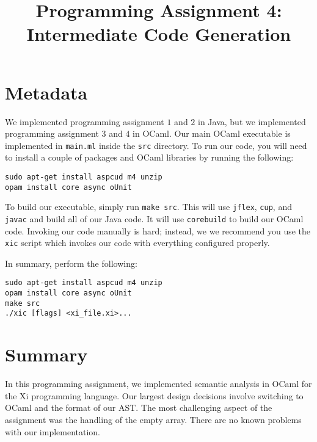 \documentclass{hw}
\title{Programming Assignment 4:\\ Intermediate Code Generation}
\begin{document}
\maketitle

\section{Metadata}\label{sec:metadata}
We implemented programming assignment $1$ and $2$ in Java, but we implemented
programming assignment $3$ and $4$ in OCaml. Our main OCaml executable is
implemented in \texttt{main.ml} inside the \texttt{src} directory. To run our
code, you will need to install a couple of packages and OCaml libraries by
running the following:

\begin{center}
\begin{BVerbatim}
sudo apt-get install aspcud m4 unzip
opam install core async oUnit
\end{BVerbatim}
\end{center}

To build our executable, simply run \texttt{make src}. This will use
\texttt{jflex}, \texttt{cup}, and \texttt{javac} and build all of our Java
code. It will use \texttt{corebuild} to build our OCaml code. Invoking our
code manually is hard; instead, we we recommend you use the \texttt{xic} script
which invokes our code with everything configured properly.

In summary, perform the following:

\begin{center}
\begin{BVerbatim}
sudo apt-get install aspcud m4 unzip
opam install core async oUnit
make src
./xic [flags] <xi_file.xi>...
\end{BVerbatim}
\end{center}

\section{Summary}\label{sec:summary}
In this programming assignment, we implemented semantic analysis in OCaml for
the Xi programming language. Our largest design decisions involve switching to
OCaml and the format of our AST. The most challenging aspect of the assignment
was the handling of the empty array. There are no known problems with our
implementation.
\end{document}
